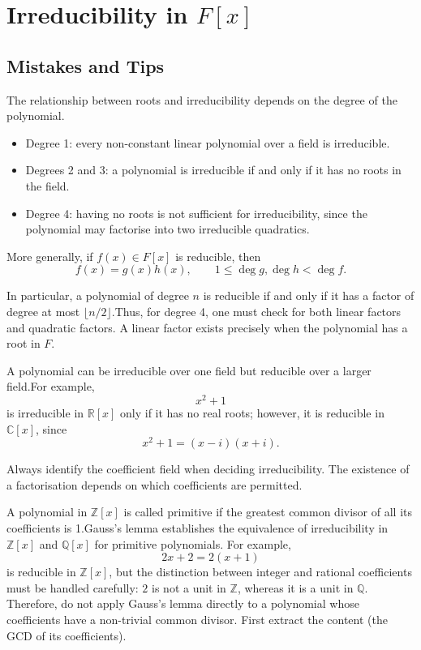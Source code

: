 \section{Irreducibility in \(F[x]\)}

\subsection{Mistakes and Tips}

\begin{mistake}
The relationship between roots and irreducibility depends on the degree of the polynomial.

\begin{itemize}
    \item Degree 1: every non-constant linear polynomial over a field is irreducible.
    \item Degrees 2 and 3: a polynomial is irreducible if and only if it has no roots in the field.
    \item Degree 4: having no roots is not sufficient for irreducibility, since the polynomial may factorise into two irreducible quadratics.
\end{itemize}

More generally, if \(f(x)\in F[x]\) is reducible, then
\[
f(x)=g(x)h(x),
\qquad
1\leq \deg g,\deg h < \deg f.
\]

In particular, a polynomial of degree \(n\) is reducible if and only if it has a factor of degree at most \(\lfloor n/2\rfloor\).Thus, for degree 4, one must check for both linear factors and quadratic factors. A linear factor exists precisely when the polynomial has a root in \(F\).
\end{mistake}

\begin{mistake}
A polynomial can be irreducible over one field but reducible over a larger field.For example,
\[
x^2+1
\]
is irreducible in \(\mathbb{R}[x]\) only if it has no real roots; however, it is reducible in \(\mathbb{C}[x]\), since
\[
x^2+1=(x-i)(x+i).
\]

Always identify the coefficient field when deciding irreducibility. The existence of a factorisation depends on which coefficients are permitted.
\end{mistake}

\begin{mistake}
A polynomial in \(\mathbb{Z}[x]\) is called primitive if the greatest common divisor of all its coefficients is 1.Gauss's lemma establishes the equivalence of irreducibility in \(\mathbb{Z}[x]\) and \(\mathbb{Q}[x]\) for primitive polynomials. For example,
\[
2x+2=2(x+1)
\]
is reducible in \(\mathbb{Z}[x]\), but the distinction between integer and rational coefficients must be handled carefully: \(2\) is not a unit in \(\mathbb{Z}\), whereas it is a unit in \(\mathbb{Q}\). Therefore, do not apply Gauss's lemma directly to a polynomial whose coefficients have a non-trivial common divisor. First extract the content (the GCD of its coefficients).
\end{mistake}


